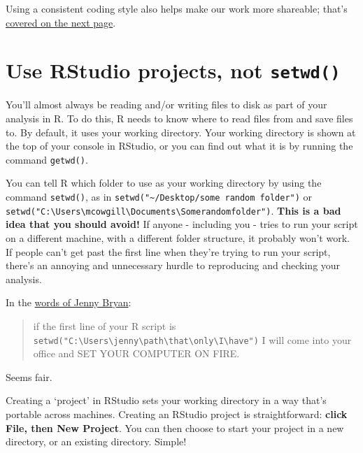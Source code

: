 \documentclass[]{book}
\begin{document}
Using a consistent coding style also helps make our work more shareable; that's \protect\hyperlink{coding-style}{covered on the next page}.

\hypertarget{use-rstudio-projects-not-setwd}{%
\section{\texorpdfstring{Use RStudio projects, not \texttt{setwd()}}{Use RStudio projects, not setwd()}}\label{use-rstudio-projects-not-setwd}}

You'll almost always be reading and/or writing files to disk as part of your analysis in R. To do this, R needs to know where to read files from and save files to. By default, it uses your working directory. Your working directory is shown at the top of your console in RStudio, or you can find out what it is by running the command \texttt{getwd()}.

You can tell R which folder to use as your working directory by using the command \texttt{setwd()}, as in \texttt{setwd("\textasciitilde{}/Desktop/some\ random\ folder")} or \texttt{setwd("C:\textbackslash{}Users\textbackslash{}mcowgill\textbackslash{}Documents\textbackslash{}Somerandomfolder")}. \textbf{This is a bad idea that you should avoid!} If anyone - including you - tries to run your script on a different machine, with a different folder structure, it probably won't work. If people can't get past the first line when they're trying to run your script, there's an annoying and unnecessary hurdle to reproducing and checking your analysis.

In the \href{https://www.tidyverse.org/articles/2017/12/workflow-vs-script/}{words of Jenny Bryan}:

\begin{quote}
if the first line of your R script is \texttt{setwd("C:\textbackslash{}Users\textbackslash{}jenny\textbackslash{}path\textbackslash{}that\textbackslash{}only\textbackslash{}I\textbackslash{}have")} I will come into your office and SET YOUR COMPUTER ON FIRE.
\end{quote}

Seems fair.

Creating a `project' in RStudio sets your working directory in a way that's portable across machines. Creating an RStudio project is straightforward: \textbf{click File, then New Project}. You can then choose to start your project in a new directory, or an existing directory. Simple!
\end{document}
